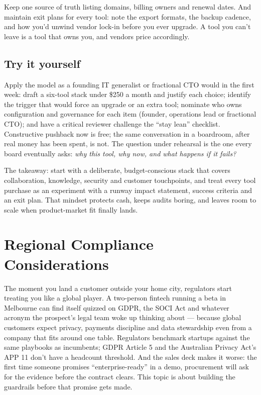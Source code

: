 Keep one source of truth listing domains, billing owners and renewal dates. And maintain exit plans for every tool: note the export formats, the backup cadence, and how you'd unwind vendor lock-in before you ever upgrade. A tool you can't leave is a tool that owns you, and vendors price accordingly.



\subsection{Try it yourself}


Apply the model as a founding IT generalist or fractional CTO would in the first week: draft a six-tool stack under \$250 a month and justify each choice; identify the trigger that would force an upgrade or an extra tool; nominate who owns configuration and governance for each item (founder, operations lead or fractional CTO); and have a critical reviewer challenge the ``stay lean'' checklist. Constructive pushback now is free; the same conversation in a boardroom, after real money has been spent, is not. The question under rehearsal is the one every board eventually asks: \emph{why this tool, why now, and what happens if it fails?}


The takeaway: start with a deliberate, budget-conscious stack that covers collaboration, knowledge, security and customer touchpoints, and treat every tool purchase as an experiment with a runway impact statement, success criteria and an exit plan. That mindset protects cash, keeps audits boring, and leaves room to scale when product-market fit finally lands.

\section{Regional Compliance Considerations}
The moment you land a customer outside your home city, regulators start treating you like a global player. A two-person fintech running a beta in Melbourne can find itself quizzed on GDPR, the SOCI Act and whatever acronym the prospect's legal team woke up thinking about — because global customers expect privacy, payments discipline and data stewardship even from a company that fits around one table. Regulators benchmark startups against the same playbooks as incumbents; GDPR Article 5 and the Australian Privacy Act's APP 11 don't have a headcount threshold. And the sales deck makes it worse: the first time someone promises ``enterprise-ready'' in a demo, procurement will ask for the evidence before the contract clears. This topic is about building the guardrails before that promise gets made.




